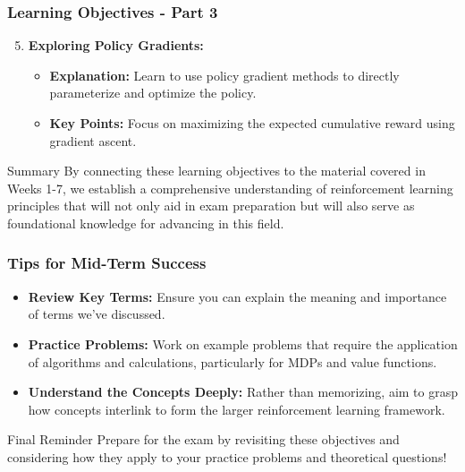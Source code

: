 \documentclass{beamer}
\begin{document}
\begin{frame}[fragile]
    \frametitle{Learning Objectives - Part 3}
    \begin{enumerate}
        \setcounter{enumi}{4} %
        \item \textbf{Exploring Policy Gradients:}
            \begin{itemize}
                \item \textbf{Explanation:} Learn to use policy gradient methods to directly parameterize and optimize the policy.
                \item \textbf{Key Points:} Focus on maximizing the expected cumulative reward using gradient ascent.
            \end{itemize}
    \end{enumerate}

    \begin{block}{Summary}
        By connecting these learning objectives to the material covered in Weeks 1-7, we establish a comprehensive understanding of reinforcement learning principles that will not only aid in exam preparation but will also serve as foundational knowledge for advancing in this field.
    \end{block}
\end{frame}

\begin{frame}[fragile]
    \frametitle{Tips for Mid-Term Success}
    \begin{itemize}
        \item \textbf{Review Key Terms:} Ensure you can explain the meaning and importance of terms we’ve discussed.
        \item \textbf{Practice Problems:} Work on example problems that require the application of algorithms and calculations, particularly for MDPs and value functions.
        \item \textbf{Understand the Concepts Deeply:} Rather than memorizing, aim to grasp how concepts interlink to form the larger reinforcement learning framework.
    \end{itemize}

    \begin{block}{Final Reminder}
        Prepare for the exam by revisiting these objectives and considering how they apply to your practice problems and theoretical questions!
    \end{block}
\end{frame}
\end{document}
